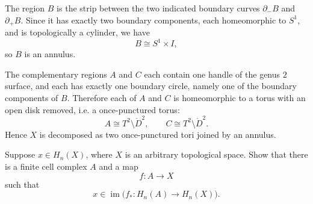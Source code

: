 \begin{solution}





The region \(B\) is the strip between the two indicated boundary curves
\(\partial_-B\) and \(\partial_+B\). Since it has exactly two boundary
components, each homeomorphic to \(S^1\), and is topologically a cylinder,
we have
\[
B \cong S^1\times I,
\]
so \(B\) is an annulus.

The complementary regions \(A\) and \(C\) each contain one handle of the
genus \(2\) surface, and each has exactly one boundary circle, namely one of
the boundary components of \(B\). Therefore each of \(A\) and \(C\) is
homeomorphic to a torus with an open disk removed, i.e. a once-punctured
torus:
\[
A \cong T^2\setminus \mathring{D}^2,
\qquad
C \cong T^2\setminus \mathring{D}^2.
\]
Hence \(X\) is decomposed as two once-punctured tori joined by an annulus.
\end{solution}

\begin{problem}
Suppose \(x\in H_n(X)\), where \(X\) is an arbitrary topological space. Show that there is a finite cell complex \(A\) and a map
\[
f:A\to X
\]
such that
\[
x\in \operatorname{im}\bigl(f_*:H_n(A)\to H_n(X)\bigr).
\]

\par
\end{problem}

